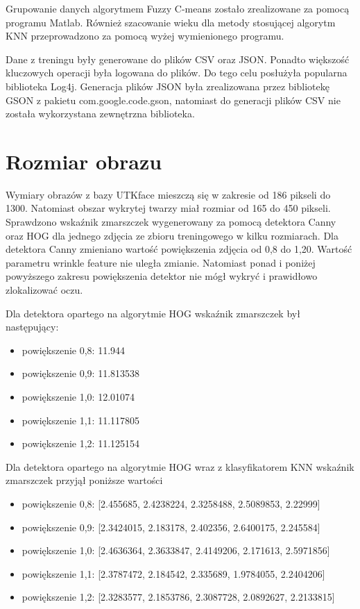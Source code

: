 \documentclass[a4paper,twoside,12pt]{book}
\begin{document}
    Grupowanie danych algorytmem Fuzzy C-means zostało zrealizowane za pomocą programu Matlab.
    Również szacowanie wieku dla metody stosującej algorytm KNN przeprowadzono za pomocą wyżej wymienionego
    programu.

    Dane z treningu były generowane do plików CSV oraz JSON. Ponadto większość kluczowych operacji była logowana do plików. Do
    tego celu posłużyła popularna biblioteka Log4j.
    Generacja plików JSON była zrealizowana przez bibliotekę GSON z pakietu com.google.code.gson, natomiast
    do generacji plików CSV nie została wykorzystana zewnętrzna biblioteka.

    \section{Rozmiar obrazu}\label{sec:rozmiar-obrazu}
    Wymiary obrazów z bazy UTKface mieszczą się w zakresie od 186 pikseli do 1300. Natomiast obszar wykrytej
    twarzy miał rozmiar od 165 do 450 pikseli.
    Sprawdzono wskaźnik zmarszczek wygenerowany za pomocą detektora Canny oraz HOG dla jednego zdjęcia ze zbioru
    treningowego w kilku rozmiarach.
    Dla detektora Canny zmieniano wartość powiększenia zdjęcia od 0,8 do 1,20. Wartość parametru wrinkle feature nie uległa
    zmianie. Natomiast ponad i poniżej powyższego zakresu powiększenia detektor nie mógł wykryć i prawidłowo zlokalizować
    oczu.

    Dla detektora opartego na algorytmie HOG wskaźnik zmarszczek był następujący:
    \begin{itemize}
        \item powiększenie 0,8: 11.944
        \item powiększenie 0,9: 11.813538
        \item powiększenie 1,0: 12.01074
        \item powiększenie 1,1: 11.117805
        \item powiększenie 1,2: 11.125154
    \end{itemize}

    Dla detektora opartego na algorytmie HOG wraz z klasyfikatorem KNN wskaźnik zmarszczek przyjął poniższe wartości

    \begin{itemize}
        \item powiększenie 0,8: [2.455685, 2.4238224, 2.3258488, 2.5089853, 2.22999]
        \item powiększenie 0,9: [2.3424015, 2.183178, 2.402356, 2.6400175, 2.245584]
        \item powiększenie 1,0: [2.4636364, 2.3633847, 2.4149206, 2.171613, 2.5971856]
        \item powiększenie 1,1: [2.3787472, 2.184542, 2.335689, 1.9784055, 2.2404206]
        \item powiększenie 1,2: [2.3283577, 2.1853786, 2.3087728, 2.0892627, 2.2133815]
    \end{itemize}
\end{document}
